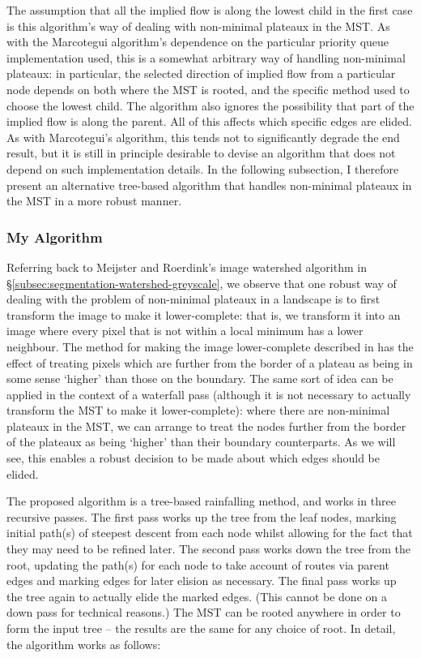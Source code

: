 The assumption that all the implied flow is along the lowest child in the first case is this algorithm's way of dealing with non-minimal plateaux in the MST. As with the Marcotegui algorithm's dependence on the particular priority queue implementation used, this is a somewhat arbitrary way of handling non-minimal plateaux: in particular, the selected direction of implied flow from a particular node depends on both where the MST is rooted, and the specific method used to choose the lowest child. The algorithm also ignores the possibility that part of the implied flow is along the parent. All of this affects which specific edges are elided. As with Marcotegui's algorithm, this tends not to significantly degrade the end result, but it is still in principle desirable to devise an algorithm that does not depend on such implementation details. In the following subsection, I therefore present an alternative tree-based algorithm that handles non-minimal plateaux in the MST in a more robust manner.

\subsubsection{My Algorithm}
\label{subsubsec:segmentation-waterfall-myalgorithm}

Referring back to Meijster and Roerdink's image watershed algorithm in \S\ref{subsec:segmentation-watershed-greyscale}, we observe that one robust way of dealing with the problem of non-minimal plateaux in a landscape is to first transform the image to make it lower-complete: that is, we transform it into an image where every pixel that is not within a local minimum has a lower neighbour. The method for making the image lower-complete described in \cite{meijster98} has the effect of treating pixels which are further from the border of a plateau as being in some sense `higher' than those on the boundary. The same sort of idea can be applied in the context of a waterfall pass (although it is not necessary to actually transform the MST to make it lower-complete): where there are non-minimal plateaux in the MST, we can arrange to treat the nodes further from the border of the plateaux as being `higher' than their boundary counterparts. As we will see, this enables a robust decision to be made about which edges should be elided.

The proposed algorithm is a tree-based rainfalling method, and works in three recursive passes. The first pass works up the tree from the leaf nodes, marking initial path(s) of steepest descent from each node whilst allowing for the fact that they may need to be refined later. The second pass works down the tree from the root, updating the path(s) for each node to take account of routes via parent edges and marking edges for later elision as necessary. The final pass works up the tree again to actually elide the marked edges. (This cannot be done on a down pass for technical reasons.) The MST can be rooted anywhere in order to form the input tree -- the results are the same for any choice of root. In detail, the algorithm works as follows:

